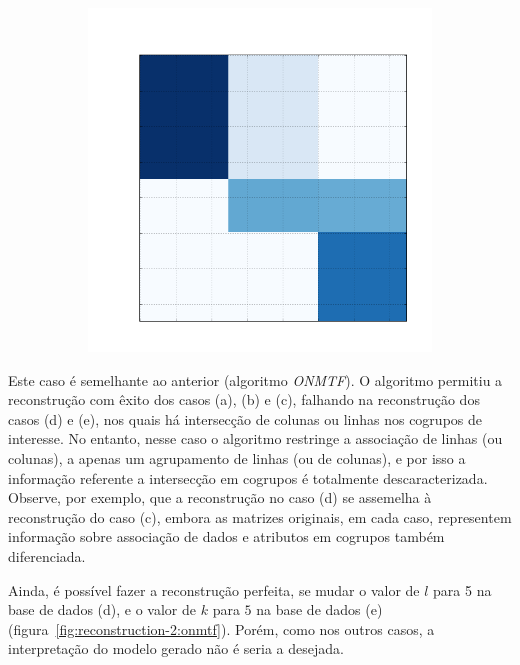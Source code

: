 \documentclass[
    12pt,                %
    oneside,            %
    a4paper,            %
    english,            %
    brazil                %
    ]{abntex2ppgsi}
\begin{document}
\begin{figure}[H]
\begin{subfigure}[b]{0.18\textwidth}
        \caption{}
    \end{subfigure}
    \begin{subfigure}[b]{0.18\textwidth}
        \includegraphics[width=\textwidth]{img/e-reconstruction-fnmtf.png}
    \caption{}
    \end{subfigure}
    \label{fig:reconstruction:fnmtf}
\end{figure}

Este caso é semelhante ao anterior (algoritmo \textit{ONMTF}).
O algoritmo permitiu a reconstrução com êxito dos casos (a), (b) e (c), falhando na reconstrução dos casos (d) e (e), nos quais há intersecção de colunas ou linhas nos cogrupos de interesse. No entanto, nesse caso o algoritmo restringe a associação de linhas (ou colunas), a apenas um agrupamento de linhas (ou de colunas), e por isso a informação referente a intersecção em cogrupos é totalmente descaracterizada.
Observe, por exemplo, que a reconstrução no caso (d) se assemelha à reconstrução do caso (c), embora as matrizes originais, em cada caso, representem informação sobre associação de dados e atributos em cogrupos também diferenciada.

Ainda, é possível fazer a reconstrução perfeita, se mudar o valor de $l$ para 5 na base de dados (d), e o valor de $k$ para $5$ na base de dados (e) (figura~\ref{fig:reconstruction-2:onmtf}).
Porém, como nos outros casos, a interpretação do modelo gerado não é seria a desejada.
\end{document}
